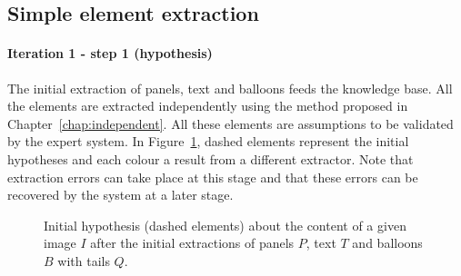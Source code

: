 \subsection{Simple element extraction} %
\label{sub:simple_element_extraction}

\paragraph{Iteration 1 - step 1 (hypothesis)} %
\label{par:step_1}
The initial extraction of panels, text and balloons feeds the knowledge base.
All the elements are extracted independently using the method proposed in Chapter~\ref{chap:independent}.
All these elements are assumptions to be validated by the expert system.
In Figure~\ref{fig:kn:graph0}, dashed elements represent the initial hypotheses and each colour a result from a different extractor.
Note that extraction errors can take place at this stage and that these errors can be recovered by the system at a later stage.


\begin{figure}[h!] %
\begin{center}
 \hspace{0.5em}
\caption[Initial hypothesis about the content of a given image]{Initial hypothesis (dashed elements) about the content of a given image $I$ after the initial extractions of panels $P$, text $T$ and balloons $B$ with tails $Q$.
}
\label{fig:kn:graph0}
\end{center}
\end{figure}

